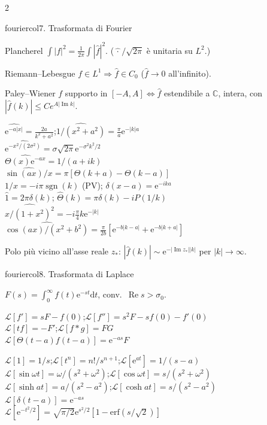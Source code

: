 \documentclass[10pt,a4paper]{article}
\newcommand{\C}{\mathbb{C}}
\newcommand{\dd}{\mathrm{d}}
\newcommand{\eu}{\mathrm{e}}
\renewcommand{\Re}{\operatorname{Re}}
\renewcommand{\Im}{\operatorname{Im}}
\DeclareMathOperator{\sgn}{sgn}
\begin{document}
\begin{multicols}{2}
\begin{secbox}{fouriercol}{7. Trasformata di Fourier}
\begin{teobox}{Plancherel}
$\int|f|^2=\frac{1}{2\pi}\int|\hat f|^2$. ($\hat{\,\cdot\,}/\sqrt{2\pi}$ è unitaria su $L^2$.)
\end{teobox}

\begin{teobox}{Riemann--Lebesgue}
$f\in L^1\Rightarrow\hat f\in C_0$ ($\hat f\to 0$ all'infinito).
\end{teobox}

\begin{teobox}{Paley--Wiener}
$f$ supporto in $[-A,A]\iff\hat f$ estendibile a $\C$, intera, con $|\hat f(k)|\le Ce^{A|\Im k|}$.
\end{teobox}

$\widehat{\eu^{-a|x|}}=\frac{2a}{k^2+a^2}$;\;$\widehat{1/(x^2+a^2)}=\frac{\pi}{a}\eu^{-|k|a}$\\
$\widehat{\eu^{-x^2/(2\sigma^2)}}=\sigma\sqrt{2\pi}\eu^{-\sigma^2k^2/2}$\\
$\widehat{\Theta(x)\eu^{-ax}}=1/(a+ik)$\\
$\widehat{\sin(ax)/x}=\pi[\Theta(k+a)-\Theta(k-a)]$\\
$\widehat{1/x}=-i\pi\sgn(k)$ (PV); $\widehat{\delta(x-a)}=\eu^{-ika}$\\
$\widehat 1=2\pi\delta(k)$; $\hat\Theta(k)=\pi\delta(k)-iP(1/k)$\\
$\widehat{x/(1+x^2)^2}=-i\frac{\pi}{4}k\eu^{-|k|}$\\
$\widehat{\cos(ax)/(x^2+b^2)}=\frac{\pi}{2b}[\eu^{-b|k-a|}+\eu^{-b|k+a|}]$

Polo più vicino all'asse reale $z_*$: $|\hat f(k)|\sim\eu^{-|\Im z_*||k|}$ per $|k|\to\infty$.

\end{secbox}

\begin{secbox}{fouriercol}{8. Trasformata di Laplace}

$F(s)=\int_0^\infty f(t)\eu^{-st}\dd t$, conv.\ $\Re s>\sigma_0$.

$\mathcal L[f']=sF-f(0)$;\;$\mathcal L[f'']=s^2F-sf(0)-f'(0)$\\
$\mathcal L[tf]=-F'$;\;$\mathcal L[f*g]=FG$\\
$\mathcal L[\Theta(t-a)f(t-a)]=\eu^{-as}F$

$\mathcal L[1]=1/s$;\;$\mathcal L[t^n]=n!/s^{n+1}$;\;$\mathcal L[\eu^{at}]=1/(s-a)$\\
$\mathcal L[\sin\omega t]=\omega/(s^2+\omega^2)$;\;$\mathcal L[\cos\omega t]=s/(s^2+\omega^2)$\\
$\mathcal L[\sinh at]=a/(s^2-a^2)$;\;$\mathcal L[\cosh at]=s/(s^2-a^2)$\\
$\mathcal L[\delta(t-a)]=\eu^{-as}$\\
$\mathcal L[\eu^{-t^2/2}]=\sqrt{\pi/2}\eu^{s^2/2}[1-\mathrm{erf}(s/\sqrt 2)]$


\end{secbox}
\end{multicols}
\end{document}
